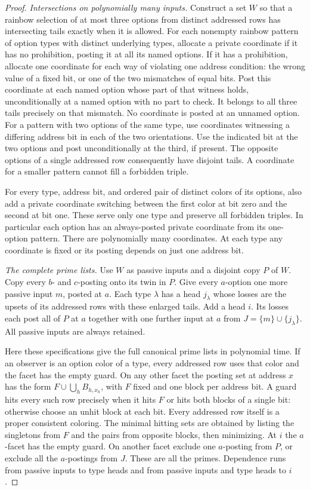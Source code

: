 \begin{proof}
\emph{Intersections on polynomially many inputs.}
Construct a set $W$ so that a rainbow selection of at most three options
from distinct addressed rows has intersecting tails exactly when it is
allowed. For each nonempty rainbow pattern of option types with
distinct underlying types, allocate a private coordinate if it has no
prohibition, posting it at all its named options. If it has a
prohibition, allocate one coordinate for each way of violating one
address condition: the wrong value of a fixed bit, or one of the two
mismatches of equal bits. Post this coordinate at each named option
whose part of that witness holds, unconditionally at a named option
with no part to check. It belongs to all three tails precisely on that
mismatch. No coordinate is posted at an unnamed option. For a pattern
with two options of the same type, use coordinates witnessing a
differing address bit in each of the two orientations. Use the indicated
bit at the two options and post unconditionally at the third, if present.
The opposite options of a single addressed row consequently have
disjoint tails. A coordinate for a smaller pattern cannot fill a
forbidden triple.

For every type, address bit, and ordered pair of distinct colors of
its options, also add a private coordinate switching between the first
color at bit zero and the second at bit one. These serve only one type
and preserve all forbidden triples. In particular each option has an
always-posted private coordinate from its one-option pattern. There
are polynomially many coordinates. At each type any coordinate is
fixed or its posting depends on just one address bit.

\emph{The complete prime lists.}
Use $W$ as passive inputs and a disjoint copy $P$ of $W$. Copy every
$b$- and $c$-posting onto its twin in $P$. Give every $a$-option
one more passive input $m$, posted at $a$. Each type $\lambda$ has a
head $j_\lambda$ whose losses are the upsets of its addressed rows
with these enlarged tails. Add a head $i$. Its losses each post all of
$P$ at $a$ together with one further input at $a$ from
$J=\{m\}\cup\{j_\lambda\}$. All passive inputs are always retained.

Here these specifications give the full canonical prime lists in
polynomial time. If an observer is an option color of a type, every
addressed row uses that color and the facet has the empty guard.
On any other facet the posting set at address $x$ has the form
$F\cup\bigcup_h B_{h,x_h}$, with $F$ fixed and one block per address
bit. A guard hits every such row precisely when it hits $F$ or hits
both blocks of a single bit: otherwise choose an unhit block at
each bit. Every addressed row itself is a proper consistent coloring.
The minimal hitting sets are obtained by listing the singletons from
$F$ and the pairs from opposite blocks, then minimizing. At $i$ the
$a$-facet has the empty guard. On another facet exclude one $a$-posting
from $P$, or exclude all the $a$-postings from $J$. These are all the
primes. Dependence runs from passive inputs to type heads and from
passive inputs and type heads to $i$.


\end{proof}
